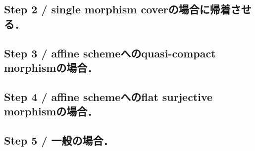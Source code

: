 \documentclass[a4paper]{jsarticle}
\begin{document}
\subsection{Step 2 / single morphism coverの場合に帰着させる．}

\subsection{Step 3 / affine schemeへのquasi-compact morphismの場合．}

\subsection{Step 4 / affine schemeへのflat surjective morphismの場合．}

\subsection{Step 5 / 一般の場合．}



\end{document}
